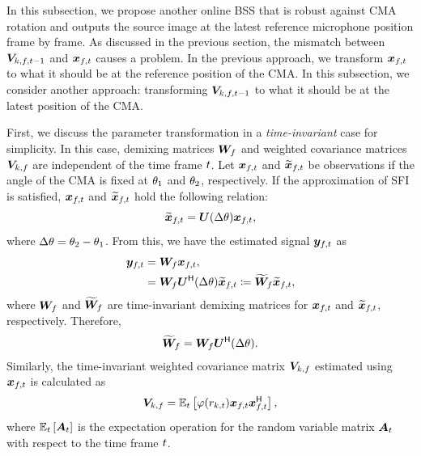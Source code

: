 \documentclass[sip,biber]{now-journal}
\begin{document}
In this subsection, we propose another online BSS that is robust against CMA rotation and outputs the source image at the latest reference microphone position frame by frame.
As discussed in the previous section, the mismatch between $\cov _{\src,\ft[-1]}$ and $\Obs _{\ft}$ causes a problem.
In the previous approach, we transform $\Obs _{\ft}$ to what it should be at the reference position of the CMA.
In this subsection, we consider another approach: transforming $\cov _{\src,\ft[-1]}$ to what it should be at the latest position of the CMA.

First, we discuss the parameter transformation in a \emph{time-invariant} case for simplicity.
In this case, demixing matrices $\bm{W} _{f}$ and weighted covariance matrices $\bm{V} _{k,f}$ are independent of the time frame $t$.
Let $\Obs _{\ft}$ and $\refpos{\Obs}_{\ft}$ be observations if the angle of the CMA is fixed at $\theta _1$ and $\theta _2$, respectively.
If the approximation of SFI is satisfied, $\Obs _{\ft}$ and $\refpos{\Obs} _{\ft}$ hold the following relation:
\begin{equation}
  \refpos{\Obs} _{\ft} = \rotMat (\Delta\rotSpat)\Obs _{\ft},
\end{equation}
where $\Delta\theta = \theta _2 - \theta _1$.
From this, we have the estimated signal $\Est _{\ft}$ as
\begin{align}
  \Est _{\ft} &= \Demix _{\freq} \Obs _{\ft}, \\
              &= \Demix _{\freq} \rotMat ^{\hermite} (\Delta\rotSpat) \refpos{\Obs} _{\ft} \coloneqq \refpos{\Demix} _{\freq} \refpos{\Obs} _{\ft}, \label{eq:rt:demix:batch}
\end{align}
where $\bm{W}_{f}$ and $\widetilde{\bm{W}} _{f}$ are time-invariant demixing matrices
for $\Obs _{\ft}$ and $\refpos{\Obs} _{\ft}$, respectively.
Therefore,
\begin{align}
  \widetilde{\bm{W}} _{f} = \bm{W} _{f} \bm{U} ^{\mathsf{H}} (\Delta\theta). \label{eq:demix:refpos}
\end{align}
Similarly, the time-invariant weighted covariance matrix $\bm{V}_{k,f}$ estimated using $\Obs_{\ft}$ is calculated as
\begin{equation}
  \cov _{\src,\freq} = \expct  _{\tframe} \left[\weight (\var _{\src,\tframe}) \Obs _{\ft} \Obs _{\ft} ^{\hermite}\right],
\end{equation}
where $\mathbb{E} _{t}\left[\bm{A} _{t}\right]$ is the expectation operation for the random variable matrix $\bm{A}_{t}$ with respect to the time frame $t$.
\end{document}

